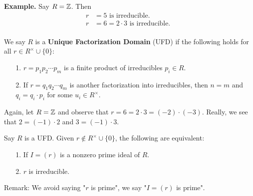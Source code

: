 \textbf{Example.} Say $R = \mathbb{Z}$. Then 
\begin{align*}
    r &= 5 \text{ is irreducible.}\\
    r &= 6 = 2 \cdot 3 \text{ is irreducible.}\\
\end{align*}

\begin{definition}
    We say $R$ is a \textbf{Unique Factorization Domain} (UFD) if
    the following holds for all $r \in  R^{\times} \cup \{0\}$:
    \begin{itemize}
        \item[1.] $r = p_1p_2\cdots p_m$ is  a finite product of
        irreducibles $p_i \in R$.
        \item[2.] If $r = q_1q_2\cdots q_m$ is another
        factorization into irreducibles, then $n = m$ and $q_i=q_i
        \cdot p_i$ for some $u_i \in R^{\times}$. 
    \end{itemize}
\end{definition}
Again, let $R = \mathbb{Z}$ and observe that  $r = 6 = 2 \cdot 3 =
(-2)\cdot(-3)$. Really, we see that $2 = (-1)\cdot 2$ and $3 =
(-1)\cdot 3$. 

\begin{proposition}
    Say $R$ is a UFD. Given $r \not\in R^{\times}
    \cup\{0\}$, the following are equivalent:
    \begin{itemize}
        \item[1.] If $I = (r)$ is a nonzero prime ideal of $R$.
        \item[2.] $r$ is irreducible.  
    \end{itemize}
\end{proposition}
Remark: We avoid saying "$r$ is prime", we say "$I = (r)$ is
prime".

